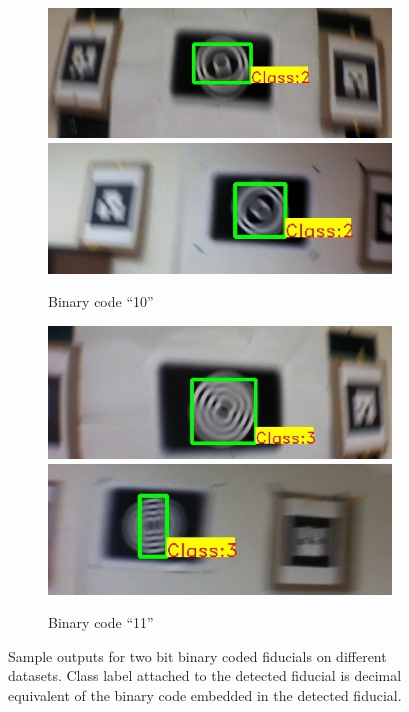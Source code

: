 \documentclass[runningheads]{llncs}
\begin{document}
\begin{figure}
\begin{subfigure}{\textwidth}
  \label{fig:output1}
\end{subfigure}
\begin{subfigure}{\textwidth}
\centering
  \includegraphics[width=0.48\linewidth]{output_10.jpg}
  \includegraphics[width=0.48\linewidth]{new_results/output_10.jpg}
  \caption{Binary code ``10''}
  \label{fig:output2}
\end{subfigure}
\begin{subfigure}{\textwidth}
\centering
  \includegraphics[width=0.48\linewidth]{output_11.jpg}
  \includegraphics[width=0.48\linewidth]{new_results/output_11.jpg}
  \caption{Binary code ``11''}
  \label{fig:output3}
  \end{subfigure}
  \caption{Sample outputs for two bit binary coded fiducials on different
  datasets. Class label attached to the detected fiducial is decimal equivalent
  of the binary code embedded in the detected fiducial.}
\end{figure}
\end{document}
